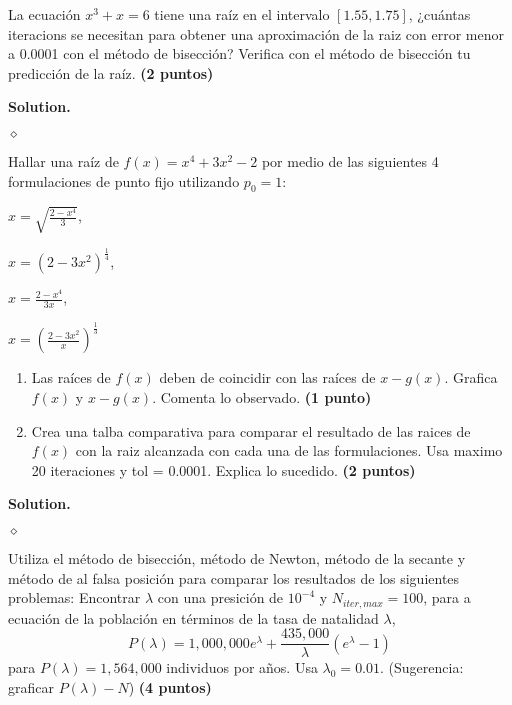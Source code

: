 \documentclass{article}
\theoremstyle{problemstyle}
\newenvironment{solution}{%
  \begin{mdframed}[linewidth=0.8pt,linecolor=Gray,backgroundcolor=Gray!5,roundcorner=5pt]%
  \noindent\textbf{Solution.}%
}{%
\hfill $ \diamond $ 
  \end{mdframed}%
}
\begin{document}
\begin{problem}
La ecuaci\'on $ x^3+x = 6 $ tiene una ra\'iz en el intervalo $ [1.55, 1.75] $, ¿cu\'antas iteracions se necesitan para obtener una aproximaci\'on de la raiz con error menor a 0.0001 con el m\'etodo de bisecci\'on? Verifica con el m\'etodo de bisecci\'on tu predicci\'on de la ra\'iz. \textbf{(2 puntos)}
\end{problem}
\begin{solution}
  
\end{solution}

\begin{problem}
Hallar una ra\'iz de $ f(x) = x^4 + 3x^2 - 2 $ por medio de las siguientes 4 formulaciones de punto fijo utilizando $ p_0 = 1 $:
\begin{center}
	\begin{enumerate*}[label=\alph*),itemjoin=\qquad]

		\item $\displaystyle x = \sqrt{\frac{2-x^4}{3}} $,
		\item $\displaystyle x = (2-3x^2)^{\frac{1}{4}}$,
		\item $\displaystyle x = \frac{2-x^4}{3x} $,
		\item $\displaystyle x = \left(\frac{2-3x^2}{x}\right)^{\frac{1}{3}}$
	\end{enumerate*}
\end{center}

\begin{enumerate}
	\item Las ra\'ices de $ f(x) $ deben de coincidir con las ra\'ices de $ x-g(x) $. Grafica $ f(x) $ y $ x-g(x) $. Comenta lo observado. \textbf{(1 punto)}

	\item Crea una talba comparativa para comparar el resultado de las raices de $f(x) $ con la raiz alcanzada con cada una de las formulaciones. Usa maximo 20 iteraciones y tol = 0.0001. Explica lo sucedido. \textbf{(2 puntos)}
\end{enumerate}
\end{problem}
\begin{solution}

\end{solution}

\begin{problem}
Utiliza el m\'etodo de bisecci\'on, m\'etodo de Newton, m\'etodo de la secante y m\'etodo de al falsa posici\'on para comparar los resultados de los siguientes problemas:
Encontrar $ \lambda $ con una presici\'on de $ 10^{-4} $ y $ N_{iter, max} = 100 $, para a ecuaci\'on de la poblaci\'on en t\'erminos de la tasa de natalidad $ \lambda $,
\[
	P(\lambda) = 1,000,000 e^{\lambda} + \frac{435,000}{\lambda}(e^{\lambda} - 1)
\]
para $ P(\lambda) = 1,564,000 $ individuos por a\~nos. Usa $ \lambda_0 = 0.01 $. (Sugerencia: graficar $ P(\lambda) - N $) \textbf{(4 puntos)}
\end{problem}




\end{document}
